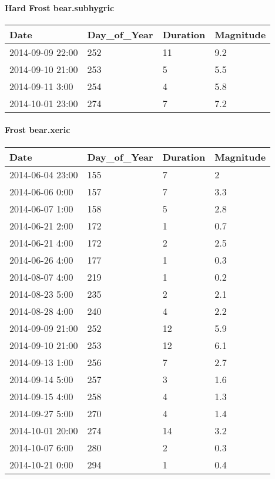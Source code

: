 \documentclass[
]{article}
\begin{document}
\hypertarget{hard-frost-bear.subhygric}{%
\paragraph{Hard Frost bear.subhygric}\label{hard-frost-bear.subhygric}}

\begin{tabular}{l|l|l|l}
\hline
Date & Day\_of\_Year & Duration & Magnitude\\
\hline
2014-09-09 22:00 & 252 & 11 & 9.2\\
\hline
2014-09-10 21:00 & 253 & 5 & 5.5\\
\hline
2014-09-11 3:00 & 254 & 4 & 5.8\\
\hline
2014-10-01 23:00 & 274 & 7 & 7.2\\
\hline
\end{tabular}

\hypertarget{frost-bear.xeric}{%
\paragraph{Frost bear.xeric}\label{frost-bear.xeric}}

\begin{tabular}{l|l|l|l}
\hline
Date & Day\_of\_Year & Duration & Magnitude\\
\hline
2014-06-04 23:00 & 155 & 7 & 2\\
\hline
2014-06-06 0:00 & 157 & 7 & 3.3\\
\hline
2014-06-07 1:00 & 158 & 5 & 2.8\\
\hline
2014-06-21 2:00 & 172 & 1 & 0.7\\
\hline
2014-06-21 4:00 & 172 & 2 & 2.5\\
\hline
2014-06-26 4:00 & 177 & 1 & 0.3\\
\hline
2014-08-07 4:00 & 219 & 1 & 0.2\\
\hline
2014-08-23 5:00 & 235 & 2 & 2.1\\
\hline
2014-08-28 4:00 & 240 & 4 & 2.2\\
\hline
2014-09-09 21:00 & 252 & 12 & 5.9\\
\hline
2014-09-10 21:00 & 253 & 12 & 6.1\\
\hline
2014-09-13 1:00 & 256 & 7 & 2.7\\
\hline
2014-09-14 5:00 & 257 & 3 & 1.6\\
\hline
2014-09-15 4:00 & 258 & 4 & 1.3\\
\hline
2014-09-27 5:00 & 270 & 4 & 1.4\\
\hline
2014-10-01 20:00 & 274 & 14 & 3.2\\
\hline
2014-10-07 6:00 & 280 & 2 & 0.3\\
\hline
2014-10-21 0:00 & 294 & 1 & 0.4\\
\hline
\end{tabular}
\end{document}
